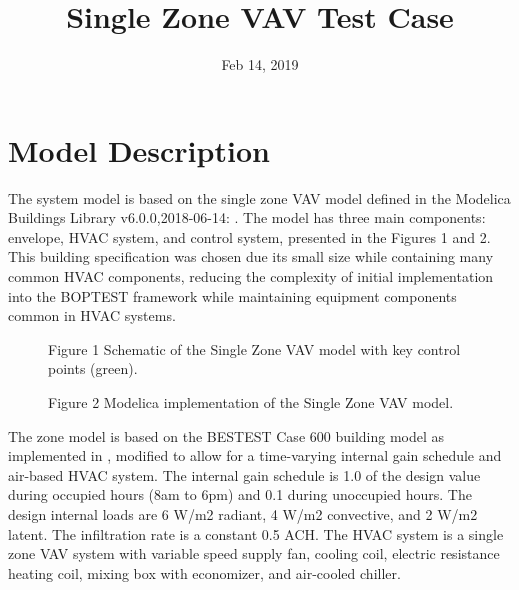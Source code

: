 \documentclass[letterpaper,10pt,english]{sphinxmanual}
\title{Single Zone VAV Test Case}
\date{Feb 14, 2019}
\author{}
\begin{document}
\pagestyle{empty}
\maketitle
\pagestyle{plain}
\sphinxtableofcontents
\pagestyle{normal}
\label{\detokenize{index::doc}}



\chapter{Model Description}
\label{\detokenize{modelDescription:model-description}}\label{\detokenize{modelDescription::doc}}
The system model is based on the single zone VAV model defined in the Modelica Buildings Library v6.0.0,2018-06-14: .  The model has three main components: envelope, HVAC system, and control system, presented in the Figures 1 and 2.  This building specification was chosen due its small size while containing many common HVAC components, reducing the complexity of initial implementation into the BOPTEST framework while maintaining equipment components common in HVAC systems.

\begin{figure}[htbp]
\centering
\capstart

\noindent{}
\caption{Figure 1 \textendash{} Schematic of the Single Zone VAV model with key control points (green).}\label{\detokenize{modelDescription:id1}}\end{figure}

\begin{figure}[htbp]
\centering
\capstart

\noindent{}
\caption{Figure 2 \textendash{} Modelica implementation of the Single Zone VAV model.}\label{\detokenize{modelDescription:id2}}\end{figure}

The zone model is based on the BESTEST Case 600 building model as implemented in , modified to allow for a time-varying internal gain schedule and air-based HVAC system.  The internal gain schedule is 1.0 of the design value during occupied hours (8am to 6pm) and 0.1 during unoccupied hours.  The design internal loads are 6 W/m2 radiant, 4 W/m2 convective, and 2 W/m2 latent.  The infiltration rate is a constant 0.5 ACH.  The HVAC system is a single zone VAV system with variable speed supply fan, cooling coil, electric resistance heating coil, mixing box with economizer, and air-cooled chiller.
\end{document}

